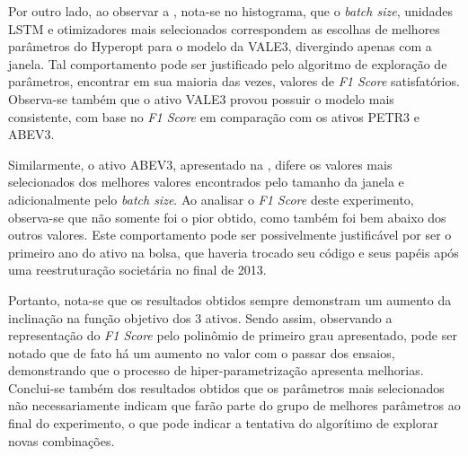 %

Por outro lado, ao observar a , nota-se no histograma, que o \textit{batch size}, unidades \acrshort{LSTM} e otimizadores mais selecionados correspondem as escolhas de melhores parâmetros do Hyperopt para o modelo da VALE3, divergindo apenas com a janela. Tal comportamento pode ser justificado pelo algoritmo de exploração de parâmetros, encontrar em sua maioria das vezes, valores de \emph{F1 Score} satisfatórios. Observa-se também que o ativo VALE3 provou possuir o modelo mais consistente, com base no \emph{F1 Score} em comparação com os ativos PETR3 e ABEV3.

%

Similarmente, o ativo ABEV3, apresentado na , difere os valores mais selecionados dos melhores valores encontrados pelo tamanho da janela e adicionalmente pelo \textit{batch size}. Ao analisar o \emph{F1 Score} deste experimento, observa-se que não somente foi o pior obtido, como também foi bem abaixo dos outros valores. Este comportamento pode ser possivelmente justificável por ser o primeiro ano do ativo na bolsa, que haveria trocado seu
código e seus papéis após uma reestruturação societária no final de 2013.

%

Portanto, nota-se que os resultados obtidos sempre demonstram um aumento da inclinação na função objetivo dos 3 ativos. Sendo assim, observando a representação do \textit{F1 Score} pelo polinômio de primeiro grau apresentado, pode ser notado que de fato há um aumento no valor com o passar dos ensaios, demonstrando que o processo de hiper-parametrização apresenta melhorias. Conclui-se também dos resultados obtidos que os parâmetros mais selecionados não necessariamente indicam que farão parte do grupo de melhores parâmetros ao final do experimento, o que pode indicar a tentativa do algorítimo de explorar novas combinações.

